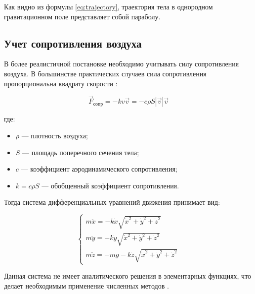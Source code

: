 Как видно из формулы \eqref{eq:trajectory}, траектория тела в однородном гравитационном поле представляет собой параболу.

\subsection{Учет сопротивления воздуха}

В более реалистичной постановке необходимо учитывать силу сопротивления воздуха. В большинстве практических случаев сила сопротивления пропорциональна квадрату скорости \cite{butenin2023}:

\begin{equation}
    \vec{F}_{\text{сопр}} = -k v \vec{v} = -c \rho S |\vec{v}| \vec{v}
    \label{eq:drag_force}
\end{equation}

где:
\begin{itemize}
    \item \(\rho\) — плотность воздуха;
    \item \(S\) — площадь поперечного сечения тела;
    \item \(c\) — коэффициент аэродинамического сопротивления;
    \item \(k = c\rho S\) — обобщенный коэффициент сопротивления.
\end{itemize}

Тогда система дифференциальных уравнений движения принимает вид:

\begin{equation}
\begin{cases}
    m\ddot{x} = -k \dot{x} \sqrt{\dot{x}^2 + \dot{y}^2 + \dot{z}^2} \\
    m\ddot{y} = -k \dot{y} \sqrt{\dot{x}^2 + \dot{y}^2 + \dot{z}^2} \\
    m\ddot{z} = -mg - k \dot{z} \sqrt{\dot{x}^2 + \dot{y}^2 + \dot{z}^2}
\end{cases}
\label{eq:drag_system}
\end{equation}

Данная система не имеет аналитического решения в элементарных функциях, что делает необходимым применение численных методов \cite{hairer2020}.